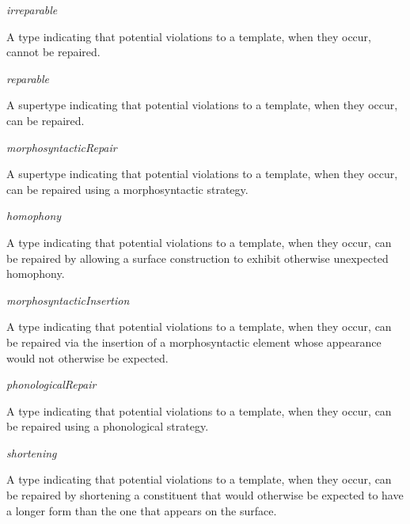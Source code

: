 \begin{ontologytop}
	\begin{classlist}

	\item \emph{irreparable}
	\hspace{1em}\parbox[t]{\linegoal}{\footnotesize A type indicating that potential violations to a template, when they occur, cannot be repaired.}


	\item \emph{reparable}
	\hspace{1em}\parbox[t]{\linegoal}{\footnotesize A supertype indicating that potential violations to a template, when they occur, can be repaired.}


		\begin{classlist}

		\item \emph{morphosyntacticRepair}
		\hspace{1em}\parbox[t]{\linegoal}{\footnotesize A supertype indicating that potential violations to a template, when they occur, can be repaired using a morphosyntactic strategy.}


			\begin{classlist}

			\item \emph{homophony}
			\hspace{1em}\parbox[t]{\linegoal}{\footnotesize A type indicating that potential violations to a template, when they occur, can be repaired by allowing a surface construction to exhibit otherwise unexpected homophony.}


			\item \emph{morphosyntacticInsertion}
			\hspace{1em}\parbox[t]{\linegoal}{\footnotesize A type indicating that potential violations to a template, when they occur, can be repaired via the insertion of a morphosyntactic element whose appearance would not otherwise be expected.}


			\end{classlist}

		\item \emph{phonologicalRepair}
		\hspace{1em}\parbox[t]{\linegoal}{\footnotesize A type indicating that potential violations to a template, when they occur, can be repaired using a phonological strategy.}


			\begin{classlist}

			\item \emph{shortening}
			\hspace{1em}\parbox[t]{\linegoal}{\footnotesize A type indicating that potential violations to a template, when they occur, can be repaired by shortening a constituent that would otherwise be expected to have a longer form than the one that appears on the surface.}



\end{classlist}
\end{classlist}
\end{classlist}
\end{ontologytop}
